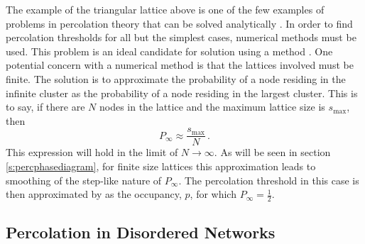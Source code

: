 The example of the triangular lattice above is one of the few examples of problems in percolation theory that can be solved analytically \cite{Kirkpatrick1973}.
In order to find percolation thresholds for all but the simplest cases, numerical methods must be used.
This problem is an ideal candidate for solution using a \mc{} method \cite{Frisch1962,Dean1967}.
One potential concern with a numerical method is that the lattices involved must be finite.
The solution is to approximate the probability of a node residing in the infinite cluster as the probability of a node residing in the largest cluster. 
This is to say, if there are $N$ nodes in the lattice and the maximum lattice size is $s_{\text{max}}$, then
\begin{equation}
	P_{\infty}\approx \frac{s_\text{max}}{N}\,.
\end{equation} 
This expression will hold in the limit of $N\rightarrow \infty$.
As will be seen in section \ref{s:percphasediagram}, for finite size lattices this approximation leads to smoothing of the step\--like nature of $P_{\infty}$.
The percolation threshold in this case is then approximated by as the occupancy, $p$, for which $P_{\infty}=\frac{1}{2}$.

\subsection{Percolation in Disordered Networks}

